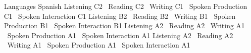 \begin{rubric}{Languages}
\noentry{~}
Spanish
\entry*[English]
Listening C2 \textbar\ Reading C2 \textbar\ Writing C1 \textbar\ Spoken Production C1 \textbar\ Spoken Interaction C1
\entry*[French]
Listening B2 \textbar\ Reading B2 \textbar\ Writing B1 \textbar\ Spoken Production B1 \textbar\ Spoken Interaction B1
\entry*[German]
Listening A2 \textbar\ Reading A2 \textbar\ Writing A1 \textbar\ Spoken Production A1 \textbar\ Spoken Interaction A1
\entry*[Albanian]
Listening A2 \textbar\ Reading A2 \textbar\ Writing A1 \textbar\ Spoken Production A1 \textbar\ Spoken Interaction A1
\end{rubric}

